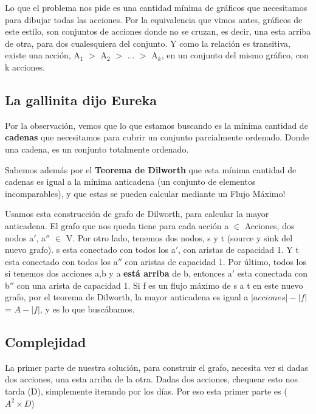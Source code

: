 \par{Lo que el problema nos pide es una cantidad mínima de gráficos que necesitamos para dibujar todas las acciones. 
Por la equivalencia que vimos antes, gráficos de este estilo, son conjuntos de acciones donde no se cruzan, es decir, 
una esta arriba de otra, para dos cualesquiera del conjunto. Y como la relación es transitiva, existe una acción,
A$_1$ $>$ A$_2$ $>$ ... $>$ A$_k$, en un conjunto del mismo gráfico, con k acciones.} 

\subsection{La gallinita dijo Eureka}

\par{Por la observación, vemos que lo que estamos buscando es la mínima cantidad de \textbf{cadenas} que necesitamos
para cubrir un conjunto parcialmente ordenado. Donde una cadena, es un conjunto totalmente ordenado.}

\par{Sabemos además por el \textbf{Teorema de Dilworth} que esta mínima cantidad de cadenas es igual a la mínima anticadena
(un conjunto de elementos incomparables), y que estas se pueden calcular mediante un Flujo Máximo!}

\par{Usamos esta construcción de grafo de Dilworth, para calcular la mayor anticadena. El grafo que nos queda 
tiene para cada acción a $\in$ Acciones, dos nodos a$'$, a$''$ $\in$ V. Por otro lado, tenemos dos nodos, s y t (source y sink del nuevo grafo).
s esta conectado con todos los a$'$, con aristas de capacidad 1. Y t esta conectado con todos los a$''$ con aristas de capacidad 1.
Por último, todos los si tenemos dos acciones a,b y a \textbf{está arriba} de b, entonces a$'$ esta conectada con b$''$ con una arista de capacidad 1.
Si f es un flujo máximo de s a t en este nuevo grafo, por el teorema de Dilworth, la mayor anticadena es igual a $|acciones| - |f|$ = $A - |f|$, y es lo que buscábamos.  
}

\subsection{Complejidad}

\par{La primer parte de nuestra solución, para construir el grafo, necesita ver si dadas dos acciones, 
una esta arriba de la otra. Dadas dos acciones, chequear esto nos tarda \bigo(D), simplemente iterando por los días.
Por eso esta primer parte es \bigo($A^2 \times D $)}

